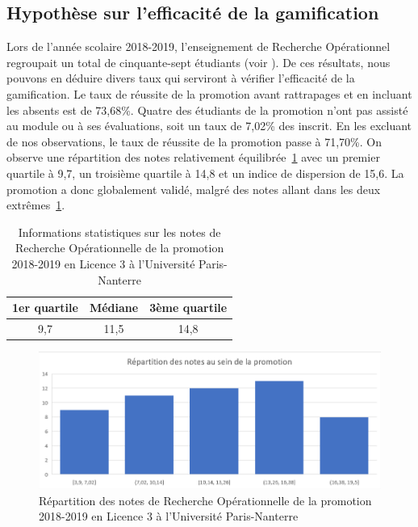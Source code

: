 \subsection{Hypothèse sur l'efficacité de la gamification}
Lors de l'année scolaire 2018-2019, l'enseignement de Recherche Opérationnel regroupait un total de cinquante-sept étudiants (voir ). De ces résultats, nous pouvons en déduire divers taux qui serviront à vérifier l'efficacité de la gamification. Le taux de réussite de la promotion avant rattrapages et en incluant les absents est de 73,68\%. Quatre des étudiants de la promotion n'ont pas assisté au module ou à ses évaluations, soit un taux de 7,02\% des inscrit. En les excluant de nos observations, le taux de réussite de la promotion passe à 71,70\%. On observe une répartition des notes relativement équilibrée~\ref{tab:OR_notes_stats} avec un premier quartile à 9,7, un troisième quartile à 14,8 et un indice de dispersion de 15,6. La promotion a donc globalement validé, malgré des notes allant dans les deux extrêmes~\ref{fig:OR_notes_repart}. \par

\begin{table}
    \begin{center}
        \begin{tabular}{|c|c|c|}
        \hline
        \textbf{1er quartile} & \textbf{Médiane} & \textbf{3ème quartile} \\ \hline
        9,7                   & 11,5             & 14,8                   \\ \hline
        \end{tabular}
        \label{tab:OR_notes_stats}
        \caption{Informations statistiques sur les notes de Recherche Opérationnelle de la promotion 2018-2019 en Licence 3 à l'Université Paris-Nanterre}
    \end{center}
\end{table}

\begin{figure}
    \centering
    \includegraphics[width=\linewidth]{Images/Repartition_notes_RO.png}
    \caption{Répartition des notes de Recherche Opérationnelle de la promotion 2018-2019 en Licence 3 à l'Université Paris-Nanterre}
    \label{fig:OR_notes_repart}
\end{figure}



